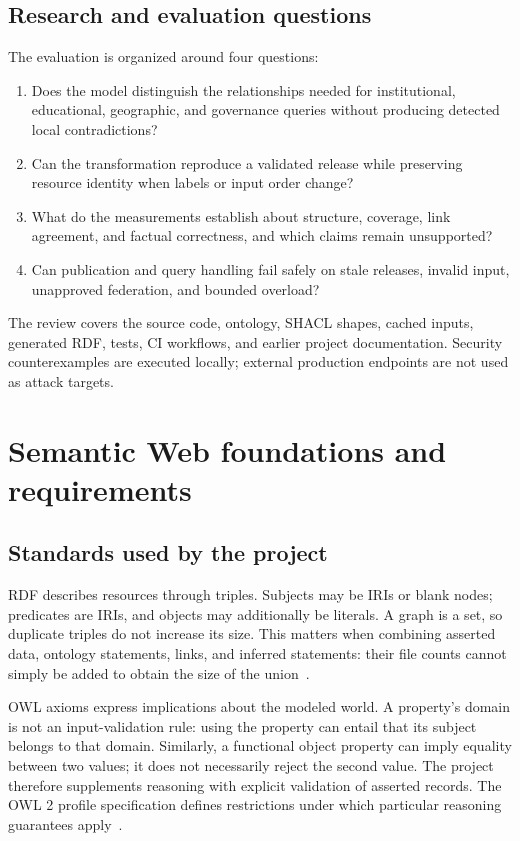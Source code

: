 \documentclass[11pt,a4paper]{article}
\begin{document}
\subsection{Research and evaluation questions}
The evaluation is organized around four questions:
\begin{enumerate}
\item Does the model distinguish the relationships needed for institutional, educational,
geographic, and governance queries without producing detected local contradictions?
\item Can the transformation reproduce a validated release while preserving resource identity
when labels or input order change?
\item What do the measurements establish about structure, coverage, link agreement, and
factual correctness, and which claims remain unsupported?
\item Can publication and query handling fail safely on stale releases, invalid input,
unapproved federation, and bounded overload?
\end{enumerate}

The review covers the source code, ontology, SHACL shapes, cached inputs, generated RDF,
tests, CI workflows, and earlier project documentation. Security counterexamples are
executed locally; external production endpoints are not used as attack targets.

\section{Semantic Web foundations and requirements}
\subsection{Standards used by the project}
RDF describes resources through triples. Subjects may be IRIs or blank nodes; predicates
are IRIs, and objects may additionally be literals. A graph is a set, so duplicate triples
do not increase its size. This matters when combining asserted data, ontology statements,
links, and inferred statements: their file counts cannot simply be added to obtain the
size of the union~\cite{rdf}.

OWL axioms express implications about the modeled world. A property's domain is not an
input-validation rule: using the property can entail that its subject belongs to that
domain. Similarly, a functional object property can imply equality between two values;
it does not necessarily reject the second value. The project therefore supplements
reasoning with explicit validation of asserted records. The OWL 2 profile specification
defines restrictions under which particular reasoning guarantees apply~\cite{owl}.
\end{document}
